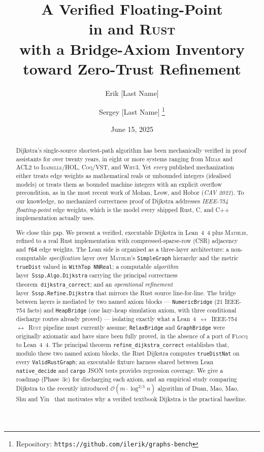 \documentclass[11pt,a4paper]{article}
\title{\textbf{A Verified Floating-Point \Dijkstra\\
       in \Lean{} and \textsc{Rust}}\\
       \large{}with a Bridge-Axiom Inventory toward Zero-Trust Refinement}
\author{
  Erik [Last Name]\and Sergey [Last Name]%
  \thanks{Repository: \texttt{https://github.com/ilerik/graphs-bench}}
}
\date{June 15, 2025}
\newcommand{\Lean}{Lean~4\xspace}
\newcommand{\Mathlib}{\textsc{Mathlib}\xspace}
\newcommand{\Dijkstra}{Dijkstra\xspace}
\newcommand{\Bigo}{\mathcal{O}}
\newcommand{\code}[1]{\texttt{#1}}
\theoremstyle{plain}
\theoremstyle{definition}
\begin{document}
\maketitle

\begin{abstract}
\noindent
\Dijkstra's single-source shortest-path algorithm has been mechanically
verified in proof assistants for over twenty years, in eight or more systems
ranging from \textsc{Mizar} and \textsc{ACL2} to \textsc{Isabelle/HOL},
\textsc{Coq/VST}, and \textsc{Why3}. Yet \emph{every} published mechanization
either treats edge weights as mathematical reals or unbounded integers
(idealised models) or treats them as bounded machine integers with an explicit
overflow precondition, as in the most recent work of Mohan, Leow, and Hobor
(\emph{CAV 2021}). To our knowledge, no mechanized correctness proof of
\Dijkstra{} addresses \emph{IEEE-754 floating-point} edge weights, which is
the model every shipped Rust, C, and C++ implementation actually uses.

We close this gap. We present a verified, executable \Dijkstra{} in
\Lean{}~4 plus \Mathlib{}, refined to a real Rust implementation with
compressed-sparse-row (CSR) adjacency and \code{f64} edge weights. The Lean
side is organised as a three-layer architecture: a non-computable
\emph{specification} layer over \Mathlib's \code{SimpleGraph} hierarchy and
the metric \code{trueDist} valued in \code{WithTop NNReal}; a computable
\emph{algorithm} layer~\code{Sssp.Algo.Dijkstra} carrying the principal
correctness theorem~\code{dijkstra\_correct}; and an
\emph{operational refinement} layer~\code{Sssp.Refine.Dijkstra} that mirrors
the Rust source line-for-line. The bridge between layers is mediated by two
named axiom blocks --- \code{NumericBridge} (21 IEEE-754 facts) and
\code{HeapBridge} (one lazy-heap simulation axiom, with three conditional
discharge routes already proved) --- isolating exactly what a
\Lean{}~$\leftrightarrow$~IEEE-754~$\leftrightarrow$~\textsc{Rust} pipeline
must currently assume; \code{RelaxBridge} and \code{GraphBridge} were
originally axiomatic and have since been fully proved, in the absence of a
port of \textsc{Flocq} to \Lean{}~4. The principal theorem
\code{refine\_dijkstra\_correct} establishes that, modulo these two named
axiom blocks,
the Rust \Dijkstra{} computes \code{trueDistNat} on every
\code{ValidRustGraph}; an executable fixture harness shared between Lean
\code{native\_decide} and \code{cargo} JSON tests provides regression
coverage. We give a roadmap (Phase~3c) for discharging each axiom, and
an empirical study comparing \Dijkstra{} to the recently introduced
$\Bigo(m\cdot \log^{2/3} n)$ algorithm of Duan, Mao, Mao, Shu and
Yin~\cite{DuanMaoMaoShuYin2025} that motivates why a verified textbook
\Dijkstra{} is the practical baseline.
\end{abstract}
\end{document}
